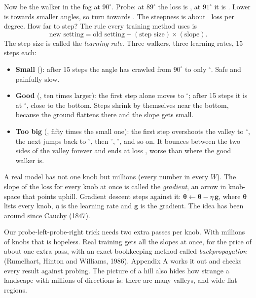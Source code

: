 Now be the walker in the fog at $90^\circ$. Probe: at $89^\circ$ the loss is \nEightProbeLeft, at
$91^\circ$ it is \nEightProbeRight. Lower is towards smaller angles, so turn towards . The
steepness is about \nEightSlopeNinety\ loss per degree. How far to step? The rule every training method uses
is
\[
\text{new setting} = \text{old setting} - (\text{step size}) \times (\text{slope}).
\]
The step size is called the \emph{learning rate}. Three walkers, three learning rates, 15 steps each:
\begin{itemize}
\item \textbf{Small} (\nEightLrSmall): after 15 steps the angle has crawled from $90^\circ$ to only
\nEightThetaSmallEnd$^\circ$. Safe and painfully slow.
\item \textbf{Good} (\nEightLrGood, ten times larger): the first step alone moves to
\nEightGoodFirst$^\circ$; after 15 steps it is at \nEightThetaGoodEnd$^\circ$, close to the bottom. Steps
shrink by themselves near the bottom, because the ground flattens there and the slope gets small.
\item \textbf{Too big} (\nEightLrBig, fifty times the small one): the first step overshoots the valley to
\nEightBigFirst$^\circ$, the next jumps back to \nEightBigSecond$^\circ$, then \nEightBigThird$^\circ$,
\nEightBigFourth$^\circ$, and so on. It bounces between the two sides of the valley forever and ends at
loss \nEightLossBigEnd, worse than where the good walker is.
\end{itemize}

\Exactly A real model has not one knob but millions (every number in every $W$). The slope of the loss for
every knob at once is called the \emph{gradient}, an arrow in knob-space that points uphill. Gradient
descent steps against it: $\bm{\theta}\leftarrow\bm{\theta}-\eta\,\bm{g}$, where $\bm{\theta}$ lists every
knob, $\eta$ is the learning rate and $\bm{g}$ is the gradient. The idea has been around since Cauchy (1847).

\begin{breaks}
Our probe-left-probe-right trick needs two extra passes per knob. With millions of knobs that is hopeless.
Real training gets all the slopes at once, for the price of about one extra pass, with an exact
bookkeeping method called \emph{backpropagation} (Rumelhart, Hinton and Williams, 1986). Appendix A works it
out and checks every result against probing. The picture of a hill also hides how strange a landscape with
millions of directions is: there are many valleys, and wide flat regions.
\end{breaks}

